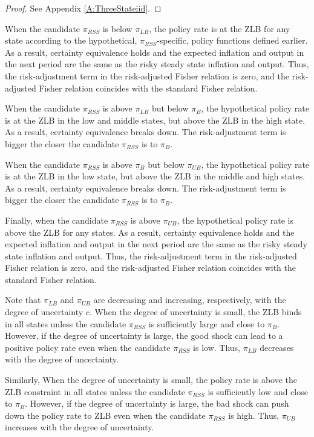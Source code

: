 \documentclass[11pt]{article}
\begin{document}
	\begin{proof}
		See Appendix \ref{A:ThreeStateiid}.
	\end{proof}
	
	When the candidate $\pi_{RSS}$ is below $\pi_{LB}$, the policy rate is at the ZLB for any state according to the hypothetical, $\pi_{RSS}$-specific, policy functions defined earlier. As a result, certainty equivalence holds and the expected inflation and output in the next period are the same as the risky steady state inflation and output. Thus, the risk-adjustment term in the risk-adjusted Fisher relation is zero, and the risk-adjusted Fisher relation coincides with the standard Fisher relation. 
	
	When the candidate $\pi_{RSS}$ is above $\pi_{LB}$ but below $\pi_{B}$, the hypothetical policy rate is at the ZLB in the low and middle states, but above the ZLB in the high state. As a result, certainty equivalence breaks down. The risk-adjustment term is bigger the closer the candidate $\pi_{RSS}$ is to $\pi_{B}$.
	
	When the candidate $\pi_{RSS}$ is above $\pi_{B}$ but below $\pi_{UB}$, the hypothetical policy rate is at the ZLB in the low state, but above the ZLB in the middle and high states. As a result, certainty equivalence breaks down. The risk-adjustment term is bigger the closer the candidate $\pi_{RSS}$ is to $\pi_{B}$.
	
	Finally, when the candidate $\pi_{RSS}$ is above $\pi_{UB}$, the hypothetical policy rate is above the ZLB for any states. As a result, certainty equivalence holds and the expected inflation and output in the next period are the same as the risky steady state inflation and output. Thus, the risk-adjustment term in the risk-adjusted Fisher relation is zero, and the risk-adjusted Fisher relation coincides with the standard Fisher relation. 
	
	Note that $\pi_{LB}$ and $\pi_{UB}$ are decreasing and increasing, respectively, with the degree of uncertainty $c$. When the degree of uncertainty is small, the ZLB binds in all states unless the candidate $\pi_{RSS}$ is sufficiently large and close to $\pi_{B}$. However, if the degree of uncertainty is large, the good shock can lead to a positive policy rate even when the candidate $\pi_{RSS}$ is low. Thus, $\pi_{LB}$ decreases with the degree of uncertainty.
	
	Similarly, When the degree of uncertainty is small, the policy rate is above the ZLB constraint in all states unless the candidate $\pi_{RSS}$ is sufficiently low and close to $\pi_{B}$. However, if the degree of uncertainty is large, the bad shock can push down the policy rate to ZLB even when the candidate $\pi_{RSS}$ is high. Thus, $\pi_{UB}$ increases with the degree of uncertainty.
	
\end{document}

